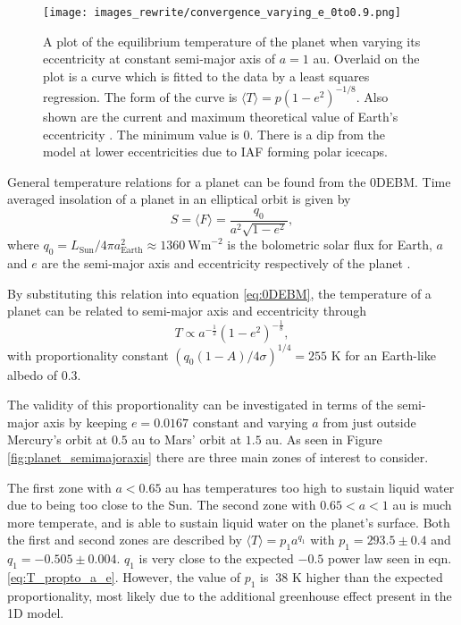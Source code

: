 \documentclass[12pt, onecolumn]{revtex4-2}    %
\begin{document}
\begin{figure}[t]
  \texttt{[image: images\_rewrite/convergence\_varying\_e\_0to0.9.png]}
  \caption{
    A plot of the equilibrium temperature of the planet when varying its eccentricity at constant semi-major axis of $a = 1$ au.
    Overlaid on the plot is a curve which is fitted to the data by a least squares regression.
    The form of the curve is $\langle T \rangle = p(1-e^2)^{-1/8}$.
    Also shown are the current and maximum theoretical value of Earth's eccentricity \cite{LA2010}.
    The minimum value is $0$.
    There is a dip from the model at lower eccentricities due to IAF forming polar icecaps.
  }
  \label{fig:planet_eccentricity}
\end{figure}

General temperature relations for a planet can be found from the 0DEBM.
Time averaged insolation of a planet in an elliptical orbit is given by
\begin{equation}
  S = \langle F \rangle = \frac{q_0}{a^2 \sqrt{1-e^2}},
  \label{eq:avgInsolation}
\end{equation}
where $q_0 = L_{\text{Sun}}/4\pi a_{\text{Earth}}^2 \approx 1360 \ \text{Wm}^{-2}$ is the bolometric solar flux for Earth, $a$ and $e$ are the semi-major axis and eccentricity respectively of the planet \cite{Mendez2017}.

By substituting this relation into equation \eqref{eq:0DEBM}, the temperature of a planet can be related to semi-major axis and eccentricity through
\begin{equation}
  T \propto a^{-\frac{1}{2}} (1-e^2)^{-\frac{1}{8}}, 
  \label{eq:T_propto_a_e}
\end{equation}
with proportionality constant $(q_0 (1-A) / 4\sigma)^{1/4} = 255$ K for an Earth-like albedo of 0.3.


The validity of this proportionality can be investigated in terms of the semi-major axis by keeping $e = 0.0167$ constant and varying $a$ from just outside Mercury's orbit at $0.5$ au to Mars' orbit at $1.5$ au.
As seen in Figure \ref{fig:planet_semimajoraxis} there are three main zones of interest to consider.

The first zone with $a < 0.65$ au has temperatures too high to sustain liquid water due to being too close to the Sun.
The second zone with $0.65 < a < 1$ au is much more temperate, and is able to sustain liquid water on the planet's surface.
Both the first and second zones are described by $\langle T \rangle = p_1 a^{q_1}$ with $p_1 = 293.5 \pm 0.4$ and $q_1= -0.505 \pm 0.004$. $q_1$ is very close to the expected $-0.5$ power law seen in eqn. \eqref{eq:T_propto_a_e}.
However, the value of $p_1$ is $~38$ K higher than the expected proportionality, most likely due to the additional greenhouse effect present in the 1D model.
\end{document}
